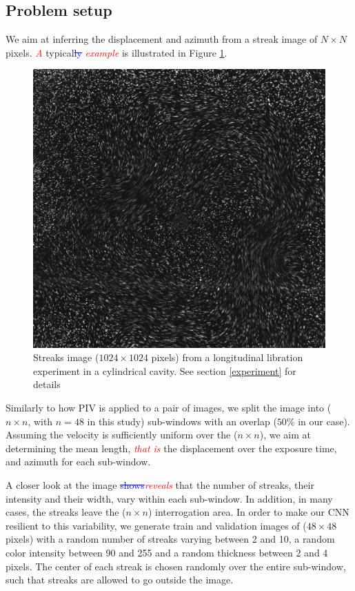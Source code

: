 \documentclass{svjour3}                     %
\newcommand{\new}[1]{\textit{\textcolor{red}{#1}}}
\newcommand{\old}[1]{\textcolor{blue}{\sout{#1}}}
\begin{document}
\subsection{Problem setup}

We aim at inferring the displacement and azimuth from a streak image of $N \times N$ pixels. \new{A} typical\old{ly} \new{example} is illustrated in Figure \ref{fig:expImage}.

\begin{figure}
	\includegraphics[width=\textwidth]{figs/figure0.jpg}
	\caption{Streaks image ($1024\times1024$ pixels) from a longitudinal libration experiment in a cylindrical cavity. See section \ref{experiment} for details}
	\label{fig:expImage}
\end{figure}
Similarly to how PIV is applied to a pair of images, we split the image into ($n \times n$, with $n = 48$ in this study) sub-windows with an overlap ($50\%$ in our case). Assuming the velocity is sufficiently uniform over the ($n \times n$), we aim at determining the mean length, \new{that is} the displacement over the exposure time, and azimuth for each sub-window. 

A closer look at the image \old{shows}\new{reveals} that the number of streaks, their intensity and their width, vary within each sub-window. In addition, in many cases, the streaks leave the ($n \times n$) interrogation area. In order to make our CNN resilient to this variability, we generate train and validation images of ($48 \times 48$ pixels) with a random number of streaks varying between 2 and 10, a random color intensity between 90 and 255 and a random thickness between 2 and 4 pixels. The center of each streak is chosen randomly over the entire sub-window, such that streaks are allowed to go outside the image.
\end{document}
